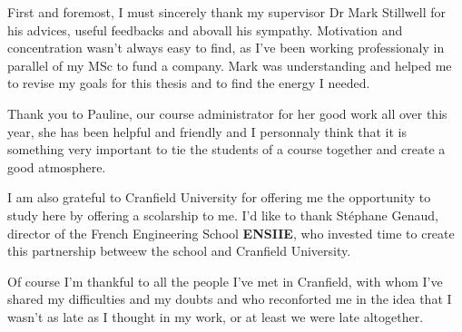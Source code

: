 First and foremost, I must sincerely thank my supervisor Dr Mark Stillwell for
his advices, useful feedbacks and abovall his sympathy. Motivation and
concentration wasn't always easy to find, as I've been working professionaly in
parallel of my MSc to fund a company. Mark was understanding and helped
me to revise my goals for this thesis and to find the energy I needed.

Thank you to Pauline, our course administrator for her good work all over this
year, she has been helpful and friendly and I personnaly think that it is
something very important to tie the students of a course together and create
a good atmosphere.

I am also grateful to Cranfield University for offering me the opportunity to
study here by offering a scolarship to me. I'd like to thank Stéphane Genaud,
director of the French Engineering School \textbf{ENSIIE}, who invested time to
create this partnership betweew the school and Cranfield University.

Of course I'm thankful to all the people I've met in Cranfield, with whom I've
shared my difficulties and my doubts and who reconforted me in the idea that I
wasn't as late as I thought in my work, or at least we were late altogether.
